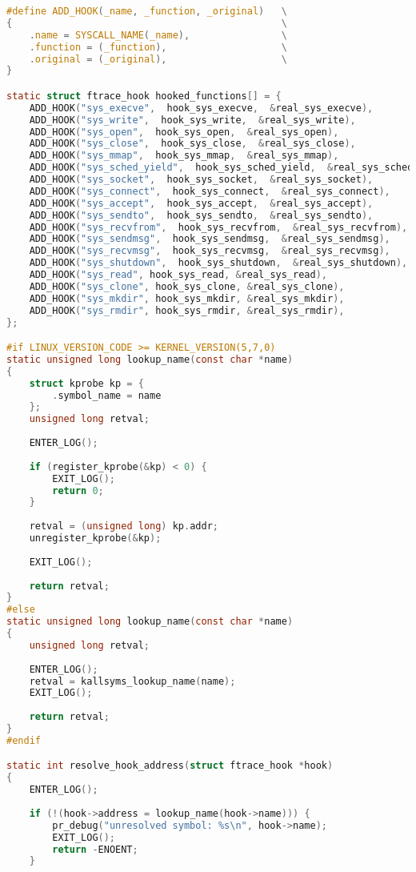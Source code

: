 \begin{lstlisting}[label=lst:log, caption=Листинг файла hooks.c, language=c]
#define ADD_HOOK(_name, _function, _original)   \
{                                               \
	.name = SYSCALL_NAME(_name),                \
	.function = (_function),                    \
	.original = (_original),                    \
}

static struct ftrace_hook hooked_functions[] = {
	ADD_HOOK("sys_execve",  hook_sys_execve,  &real_sys_execve),
	ADD_HOOK("sys_write",  hook_sys_write,  &real_sys_write),
	ADD_HOOK("sys_open",  hook_sys_open,  &real_sys_open),
	ADD_HOOK("sys_close",  hook_sys_close,  &real_sys_close),
	ADD_HOOK("sys_mmap",  hook_sys_mmap,  &real_sys_mmap),
	ADD_HOOK("sys_sched_yield",  hook_sys_sched_yield,  &real_sys_sched_yield),
	ADD_HOOK("sys_socket",  hook_sys_socket,  &real_sys_socket),
	ADD_HOOK("sys_connect",  hook_sys_connect,  &real_sys_connect),
	ADD_HOOK("sys_accept",  hook_sys_accept,  &real_sys_accept),
	ADD_HOOK("sys_sendto",  hook_sys_sendto,  &real_sys_sendto),
	ADD_HOOK("sys_recvfrom",  hook_sys_recvfrom,  &real_sys_recvfrom),
	ADD_HOOK("sys_sendmsg",  hook_sys_sendmsg,  &real_sys_sendmsg),
	ADD_HOOK("sys_recvmsg",  hook_sys_recvmsg,  &real_sys_recvmsg),
	ADD_HOOK("sys_shutdown",  hook_sys_shutdown,  &real_sys_shutdown),
	ADD_HOOK("sys_read", hook_sys_read, &real_sys_read),
	ADD_HOOK("sys_clone", hook_sys_clone, &real_sys_clone),
	ADD_HOOK("sys_mkdir", hook_sys_mkdir, &real_sys_mkdir),
	ADD_HOOK("sys_rmdir", hook_sys_rmdir, &real_sys_rmdir),
};

#if LINUX_VERSION_CODE >= KERNEL_VERSION(5,7,0)
static unsigned long lookup_name(const char *name)
{
	struct kprobe kp = {
		.symbol_name = name
	};
	unsigned long retval;
	
	ENTER_LOG();
	
	if (register_kprobe(&kp) < 0) {
		EXIT_LOG();
		return 0;
	}
	
	retval = (unsigned long) kp.addr;
	unregister_kprobe(&kp);
	
	EXIT_LOG();
	
	return retval;
}
#else
static unsigned long lookup_name(const char *name)
{
	unsigned long retval;
	
	ENTER_LOG();
	retval = kallsyms_lookup_name(name);
	EXIT_LOG();
	
	return retval;
}
#endif

static int resolve_hook_address(struct ftrace_hook *hook)
{
	ENTER_LOG();
	
	if (!(hook->address = lookup_name(hook->name))) {
		pr_debug("unresolved symbol: %s\n", hook->name);
		EXIT_LOG();
		return -ENOENT;
	}
	

\end{lstlisting}
